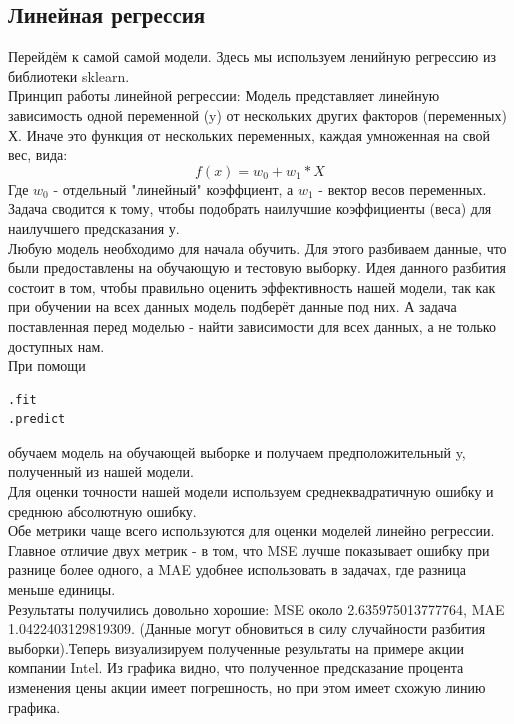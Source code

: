 \documentclass{article}
\begin{document}
\subsection{Линейная регрессия}
Перейдём к самой самой модели. Здесь мы используем ленийную регрессию из библиотеки sklearn.  
\\
 
Принцип работы линейной регрессии: 
Модель представляет линейную зависимость одной переменной (y) от нескольких других факторов (переменных) Х. Иначе это функция от нескольких переменных, каждая умноженная на свой вес, вида: 
$$f(x) = w_0 + w_1 * X$$ 
Где $w_0 $ - отдельный "линейный" коэффциент, а  $w_1 $ - вектор весов переменных. Задача сводится к тому, чтобы подобрать наилучшие коэффициенты (веса) для наилучшего предсказания у. 
\\
 
Любую модель необходимо для начала обучить. Для этого разбиваем данные, что были предоставлены на обучающую и тестовую выборку. Идея данного разбития состоит в том, чтобы правильно оценить эффективность нашей модели, так как при обучении на всех данных модель подберёт данные под них. А задача поставленная перед моделью - найти зависимости для всех данных, а не только доступных нам.  
\\
 
При помощи \begin{lstlisting}
.fit
.predict
\end{lstlisting} обучаем модель на обучающей выборке и получаем предположительный y, полученный из нашей модели.  
\\
 
Для оценки точности нашей модели используем среднеквадратичную ошибку и среднюю абсолютную ошибку.
\\

Обе метрики чаще всего используются для оценки моделей линейно регрессии. Главное отличие двух метрик - в том, что MSE лучше показывает ошибку при разнице более одного, а MAE удобнее использовать в задачах, где разница меньше единицы.  
\\

Результаты получились довольно хорошие: MSE около 2.635975013777764, MAE 1.0422403129819309. (Данные могут обновиться в силу случайности разбития выборки).Теперь визуализируем полученные результаты на примере акции компании Intel. Из графика видно, что полученное предсказание процента изменения цены акции имеет погрешность, но при этом имеет схожую линию графика. 
\\
\end{document}
